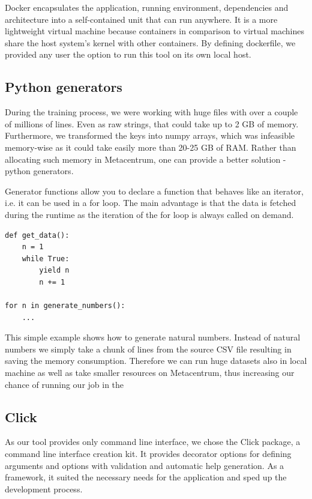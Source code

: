 Docker encapsulates the application, running environment, dependencies and architecture into a self-contained unit that can run anywhere. It is a more lightweight virtual machine because containers in comparison to virtual machines share the host system's kernel with other containers\cite{docker-blog}. By defining dockerfile, we provided any user the option to run this tool on its own local host.

\subsection{Python generators}

\label{python-generators}

During the training process, we were working with huge files with over a couple of millions of lines. Even as raw strings, that could take up to 2 GB of memory. Furthermore, we transformed the keys into numpy arrays, which was infeasible memory-wise as it could take easily more than 20-25 GB of RAM. Rather than allocating such memory in Metacentrum, one can provide a better solution - python generators\cite{python-gen}. 

Generator functions allow you to declare a function that behaves like an iterator, i.e. it can be used in a for loop. The main advantage is that the data is fetched during the runtime as the iteration of the for loop is always called on demand.

\begin{verbatim}
def get_data():
	n = 1
	while True:
		yield n
		n += 1
		
for n in generate_numbers():
	...
\end{verbatim}

This simple example shows how to generate natural numbers. Instead of natural numbers we simply take a chunk of lines from the source CSV file resulting in saving the memory consumption. Therefore we can run huge datasets also in local machine as well as take smaller resources on Metacentrum, thus increasing our chance of running our job in the 

\subsection{Click}

As our tool provides only command line interface, we chose the Click package\cite{click}, a command line interface creation kit. It provides decorator options for defining arguments and options with validation and automatic help generation. As a framework, it suited the necessary needs for the application and sped up the development process.

